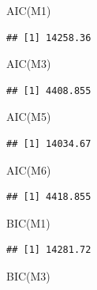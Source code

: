 \documentclass[
]{ctexart}
\newenvironment{Shaded}{\begin{snugshade}}{\end{snugshade}}
\newcommand{\FunctionTok}[1]{\textcolor[rgb]{0.00,0.00,0.00}{#1}}
\newcommand{\NormalTok}[1]{#1}
\begin{document}
\begin{Shaded}
\begin{Highlighting}[]
\FunctionTok{AIC}\NormalTok{(M1)}
\end{Highlighting}
\end{Shaded}

\begin{verbatim}
## [1] 14258.36
\end{verbatim}

\begin{Shaded}
\begin{Highlighting}[]
\FunctionTok{AIC}\NormalTok{(M3)}
\end{Highlighting}
\end{Shaded}

\begin{verbatim}
## [1] 4408.855
\end{verbatim}

\begin{Shaded}
\begin{Highlighting}[]
\FunctionTok{AIC}\NormalTok{(M5)}
\end{Highlighting}
\end{Shaded}

\begin{verbatim}
## [1] 14034.67
\end{verbatim}

\begin{Shaded}
\begin{Highlighting}[]
\FunctionTok{AIC}\NormalTok{(M6)}
\end{Highlighting}
\end{Shaded}

\begin{verbatim}
## [1] 4418.855
\end{verbatim}

\begin{Shaded}
\begin{Highlighting}[]
\FunctionTok{BIC}\NormalTok{(M1)}
\end{Highlighting}
\end{Shaded}

\begin{verbatim}
## [1] 14281.72
\end{verbatim}

\begin{Shaded}
\begin{Highlighting}[]
\FunctionTok{BIC}\NormalTok{(M3)}
\end{Highlighting}
\end{Shaded}
\end{document}
